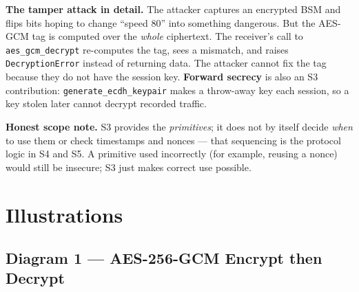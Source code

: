 \documentclass[11pt,a4paper]{article}
\begin{document}
\noindent\textbf{The tamper attack in detail.} The attacker captures an encrypted
BSM and flips bits hoping to change ``speed 80'' into something dangerous. But
the AES-GCM tag is computed over the \emph{whole} ciphertext. The receiver's call
to \texttt{aes\_gcm\_decrypt} re-computes the tag, sees a mismatch, and raises
\texttt{DecryptionError} instead of returning data. The attacker cannot fix the
tag because they do not have the session key. \textbf{Forward secrecy} is also an
S3 contribution: \texttt{generate\_ecdh\_keypair} makes a throw-away key each
session, so a key stolen later cannot decrypt recorded traffic.

\textbf{Honest scope note.} S3 provides the \emph{primitives}; it does not by
itself decide \emph{when} to use them or check timestamps and nonces --- that
sequencing is the protocol logic in S4 and S5. A primitive used incorrectly (for
example, reusing a nonce) would still be insecure; S3 just makes correct use
possible.

\section{Illustrations}

\subsection{Diagram 1 --- AES-256-GCM Encrypt then Decrypt}
\begin{center}
\end{center}
\end{document}

